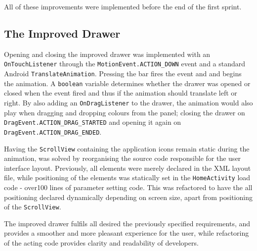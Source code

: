 All of these improvements were implemented before the end of the first sprint. 

\subsection{The Improved Drawer}

Opening and closing the improved drawer was implemented with an \lstinline{OnTouchListener} through the \lstinline{MotionEvent.ACTION_DOWN} event and a standard Android \lstinline{TranslateAnimation}.
Pressing the bar fires the event and and begins the animation.
A \lstinline{boolean} variable determines whether the drawer was opened or closed when the event fired and thus if the animation should translate left or right.
By also adding an \lstinline{OnDragListener} to the drawer, the animation would also play when dragging and dropping colours from the panel; closing the drawer on \lstinline{DragEvent.ACTION_DRAG_STARTED} and opening it again on \lstinline{DragEvent.ACTION_DRAG_ENDED}.

Having the \lstinline{ScrollView} containing the application icons remain static during the animation, was solved by reorganising the source code responsible for the user interface layout. 
Previously, all elements were merely declared in the XML layout file, while positioning of the elements was statically set in the \lstinline{HomeActivity} load code - over100 lines of parameter setting code.
This was refactored to have the all positioning declared dynamically depending on screen size, apart from positioning of the \lstinline{ScrollView}.

The improved drawer fulfils all desired the previously specified requirements, and provides a smoother and more pleasant experience for the user, while refactoring of the acting code provides clarity and readability of developers.

